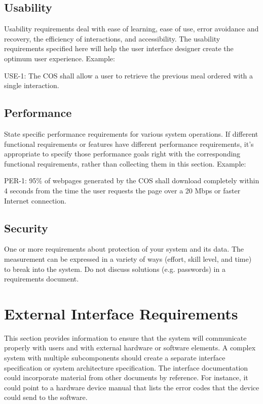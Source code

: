 \documentclass[A4paper,12pt]{report}
\theoremstyle{plain}
\theoremstyle{definition}
\theoremstyle{remark}
\numberwithin{equation}{section}
\begin{document}
\subsection{Usability}
Usability requirements deal with ease of learning, ease of use, error avoidance and recovery, the efficiency of interactions, and accessibility. The usability requirements specified here will help the user interface designer create the optimum user experience.
Example:

USE-1: The COS shall allow a user to retrieve the previous meal ordered with a single interaction.

\subsection{Performance}
State specific performance requirements for various system operations. If different functional requirements or features have different performance requirements, it’s appropriate to specify those performance goals right with the corresponding functional requirements, rather than collecting them in this section. 
Example:

PER-1:	 95\% of webpages generated by the COS shall download completely within 4 seconds from the time the user requests the page over a 20 Mbps or faster Internet connection.

\subsection{Security} 
One or more requirements about protection of your system and its data. The measurement can be expressed in a variety of ways (effort, skill level, and time) to break into the system.  Do not discuss solutions (e.g. passwords) in a requirements document.

\section{External Interface Requirements}
This section provides information to ensure that the system will communicate properly with users and with external hardware or software elements. A complex system with multiple subcomponents should create a separate interface specification or system architecture specification. The interface documentation could incorporate material from other documents by reference. For instance, it could point to a hardware device manual that lists the error codes that the device could send to the software. 
\end{document}
